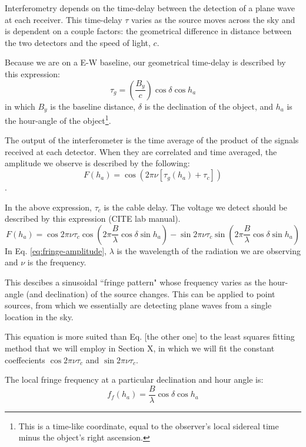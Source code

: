 \documentclass[12pt]{article}
\begin{document}
Interferometry depends on the time-delay between the detection of a plane wave at each receiver. This time-delay $\tau$ varies as the source moves across the sky and is dependent on a couple factors: the geometrical difference in distance between the two detectors and the speed of light, $c$.

Because we are on a E-W baseline, our geometrical time-delay is described by this expression:
\begin{equation}
\tau_g= \left( \frac{B_y}{c} \right) \cos{\delta} \cos{h_a}
\end{equation}
in which $B_y$ is the baseline distance, $\delta$ is the declination of the object, and $h_a$ is the hour-angle of the object\footnote{This is a time-like coordinate, equal to the observer's local sidereal time minus the object's right ascension.}.

The output of the interferometer is the time average of the product of the signals received at each detector. When they are correlated and time averaged, the amplitude we observe is described by the following:
\begin{equation}
F(h_a) = \cos(2\pi \nu [\tau_g (h_a) + \tau_c]) \label{eq:fringe-output}
\end{equation}.

In the above expression, $\tau_c$ is the cable delay. The voltage we detect should be described by this expression (CITE lab manual).
\begin{equation}
F(h_a) = \cos{2\pi \nu \tau_c} \cos{\left( 2\pi \frac{B}{\lambda} 
\cos{\delta} \sin{h_a} \right)} - \sin{2\pi \nu \tau_c} \sin{\left( 2\pi \frac{B}{\lambda} 
\cos{\delta} \sin{h_a} \right)} \label{eq:fringe-amplitude}
\end{equation}
In Eq. \ref{eq:fringe-amplitude}, $\lambda$ is the wavelength of the radiation we are observing and $\nu$ is the frequency. 

This descibes a sinusoidal ``fringe pattern" whose frequency varies as the hour-angle (and declination) of the source changes. This can be applied to point sources, from which we essentially are detecting plane waves from a single location in the sky.

This equation is more suited than Eq. [the other one]  to the least squares fitting method that we will employ in Section X, in which we will fit the constant coeffecients $ \cos{2\pi \nu \tau_c}$ and $ \sin{2\pi \nu \tau_c}$.

The local fringe frequency at a particular declination and hour angle is:
\begin{equation}
f_f(h_a) = \frac{B}{\lambda} \cos{\delta} \cos{h_a} \label{eq:local-fringe-frequency}
\end{equation}
\end{document}
